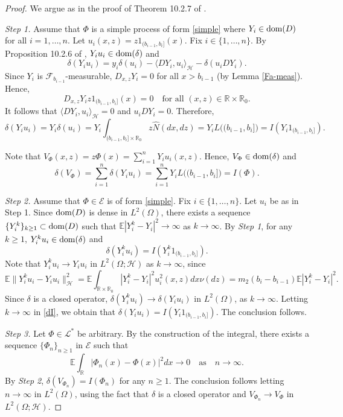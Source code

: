 \documentclass[12pt]{article}
\def\cE{\mathcal{E}}
\def\cF{\mathcal{F}}
\def\cH{\mathcal{H}}
\def\cL{\mathcal{L}}
\def\bE{\mathbb{E}}
\def\bR{\mathbb{R}}
\begin{document}
\begin{proof}
We argue as in the proof of Theorem 10.2.7 of \cite{NN}.

\medskip

{\em Step 1.} Assume that $\Phi$ is a simple process of form \eqref{simple} where  $Y_{i} \in {\rm dom}(D)$ for all $i=1,\ldots,n$. Let $u_i(x,z)=z 1_{(b_{i-1},b_i]}(x)$. Fix $i \in \{1,\ldots,n\}$. By Proposition 10.2.6 of \cite{NN}, $Y_i u_i \in {\rm dom}(\delta)$ and
\[
\delta(Y_i u_i)=y_i \delta(u_i)-\langle DY_i,u_i \rangle_{\cH}-\delta(u_i DY_i).
\]
Since $Y_i$ is $\cF_{b_{i-1}}$-measurable, $D_{x,z}Y_i=0$ for all $x>b_{i-1}$ (by Lemma \ref{Fa-meas}). Hence,
\[
D_{x,z} Y_i z 1_{(b_{i-1},b_i]}(x)=0 \quad \mbox{for all $(x,z)\in \bR \times \bR_0$.}
\]
It follows that $\langle DY_i,u_i \rangle_{\cH}=0$ and $u_i DY_i=0$. Therefore,
\[
\delta(Y_i u_i)=Y_i \delta(u_i)=Y_i \int_{(b_{i-1},b_i] \times \bR_0} z  \widehat{N}(dx,dz)=Y_i L\big((b_{i-1},b_i] \big)=I(Y_i 1_{(b_{i-1},b_i]}).
\]

Note that $V_{\Phi}(x,z)=z\Phi(x)=\sum_{i=1}^{n}Y_iu_i(x,z)$. Hence, $V_{\Phi} \in {\rm dom}(\delta)$ and
\[
\delta(V_{\Phi})=\sum_{i=1}^{n} \delta(Y_i u_i)=\sum_{i=1}^{n}Y_i L\big((b_{i-1},b_i] \big)=I(\Phi).
\]

\medskip

{\em Step 2.} Assume that $\Phi \in \cE$ is of form \eqref{simple}. Fix $i\in \{1,\ldots, n\}$. Let $u_i$ be as in Step 1. Since ${\rm dom}(D)$ is dense in $L^2(\Omega)$, there exists a sequence $\{Y_i^{k}\}_{k\geq 1} \subset {\rm dom}(D)$ such that $\bE|Y_i^k-Y_i|^2 \to \infty$ as $k \to \infty$. 
By {\em Step 1}, for any $k\geq 1$, $Y_i^k u_i \in {\rm dom}(\delta)$ and 
\begin{equation}
\label{dI}
\delta(Y_i^k u_i) =I(Y_i^k 1_{(b_{i-1},b_i]}).
\end{equation} 
Note that  $Y_i^k u_i \to Y_i u_i$ in $L^2(\Omega;\cH)$ as $k \to \infty$, since
\[
\bE\|Y_i^k u_i - Y_i u_i\|_{\cH}^2=\bE\int_{\bR \times \bR_{0}} |Y_i^k-Y_i|^2 u_i^2(x,z)dx\nu(dz)=m_2 (b_i-b_{i-1})\bE|Y_i^k-Y_i|^2.
\]
Since $\delta$ is a closed operator, $\delta(Y_i^k u_i) \to \delta(Y_i u_i)$ in $L^2(\Omega)$, as $k \to \infty$.
Letting $k \to \infty$ in \eqref{dI}, we obtain that $\delta(Y_i u_i) =I(Y_i 1_{(b_{i-1},b_i]})$. The conclusion follows.


\medskip

{\em Step 3.} Let $\Phi \in \cL^*$ be arbitrary. By the construction of the integral, there exists a sequence $\{\Phi_n\}_{n\geq 1}$ in $\cE$ such that
\[
\bE\int_{\bR}|\Phi_n(x)-\Phi(x)|^2 dx \to 0 \quad \mbox{as} \quad n\to \infty.
\]
By {\em Step 2}, $\delta(V_{\Phi_n})=I(\Phi_n)$ for any $n\geq 1$. The conclusion follows letting $n \to \infty$ in $L^2(\Omega)$, using the fact that $\delta$ is a closed operator and $V_{\Phi_n} \to V_{\Phi}$ in $L^2(\Omega;\cH)$.

\end{proof}
\end{document}

